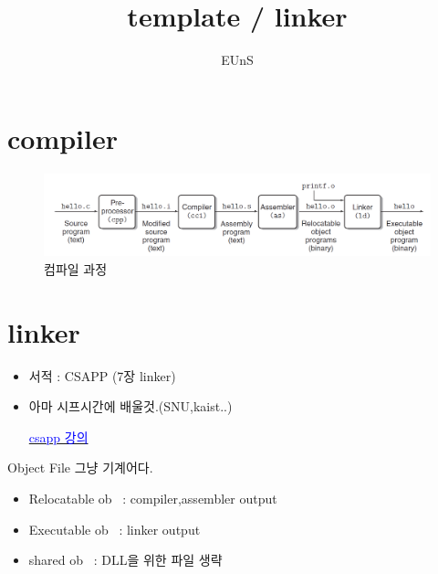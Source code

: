 \documentclass[10pt]{beamer}
\title{template / linker}
\author{EUnS}
\begin{document}

\begin{frame}{}
    \maketitle
\end{frame}    

\begin{frame}{}
    \tableofcontents
\end{frame}   


\section{compiler}

\begin{frame}
    \begin{figure}[h!]
        \centering
        \includegraphics[scale=0.25]{pic/pic1.PNG}
        \caption{컴파일 과정}
    \end{figure}
\end{frame}    

\section{linker}

\begin{frame}
    \begin{itemize}
        \item 서적 : CSAPP (7장 linker)
        \item 아마 시프시간에 배울것.(SNU,kaist..)
        
        \href{http://www.cs.cmu.edu/afs/cs/academic/class/15213-f15/www/schedule.html}{\textcolor{blue}{csapp 강의}}
        
    \end{itemize}
\end{frame}


\begin{frame}{Object File}
    그냥 기계어다.
    \begin{itemize}
        \item Relocatable ob~ : compiler,assembler output
        \item Executable ob~ : linker output
        \item shared ob~ : DLL을 위한 파일 생략
    \end{itemize}
\end{frame}    
\end{document}
